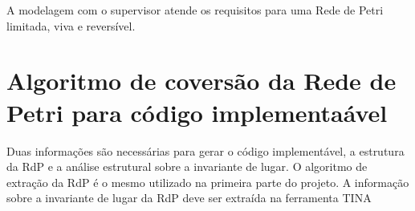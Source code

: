 A modelagem com o supervisor atende os requisitos para uma Rede de Petri limitada, viva e revers\'ivel.

\section{Algoritmo de covers\~ao da Rede de Petri para c\'odigo implementa\'avel}

Duas informa\c{c}\~oes s\~ao necess\'arias para gerar o c\'odigo implement\'avel, a estrutura da RdP e a an\'alise estrutural sobre a invariante de lugar. O algoritmo de extra\c{c}\~ao da RdP \'e o mesmo utilizado na primeira parte do projeto. A informa\c{c}\~ao sobre a invariante de lugar da RdP deve ser extra\'ida na ferramenta TINA

